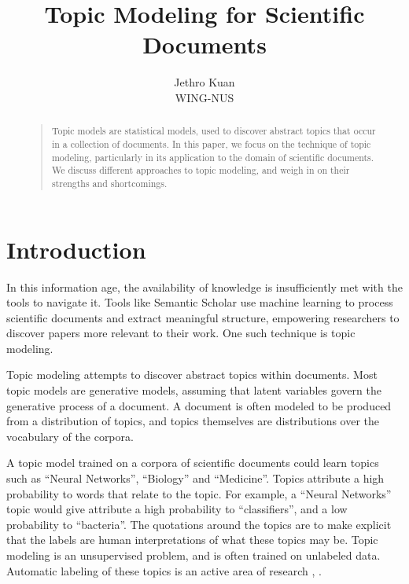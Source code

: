 \documentclass[letterpaper]{article}
\begin{document}
\nocopyright


\title{Topic Modeling for Scientific Documents}
\author{Jethro Kuan \\
  WING-NUS\\
}
\maketitle
\begin{abstract}
  \begin{quote}
    Topic models are statistical models, used to discover abstract
    topics that occur in a collection of documents. In this paper, we
    focus on the technique of topic modeling, particularly in its
    application to the domain of scientific documents. We discuss
    different approaches to topic modeling, and weigh in on their
    strengths and shortcomings.
  \end{quote}
\end{abstract}

\section{Introduction}
In this information age, the availability of knowledge is
insufficiently met with the tools to navigate it. Tools like Semantic
Scholar use machine learning to process scientific documents and
extract meaningful structure, empowering researchers to discover
papers more relevant to their work. One such technique is topic
modeling.

Topic modeling attempts to discover abstract topics within documents.
Most topic models are generative models, assuming that latent
variables govern the generative process of a document. A document is
often modeled to be produced from a distribution of topics, and topics
themselves are distributions over the vocabulary of the corpora.

A topic model trained on a corpora of scientific documents could learn
topics such as ``Neural Networks'', ``Biology'' and ``Medicine''.
Topics attribute a high probability to words that relate to the topic.
For example, a ``Neural Networks'' topic would give attribute a high
probability to ``classifiers'', and a low probability to ``bacteria''.
The quotations around the topics are to make explicit that the labels
are human interpretations of what these topics may be. Topic modeling
is an unsupervised problem, and is often trained on unlabeled data.
Automatic labeling of these topics is an active area of research
\cite{mei2007automatic}, \cite{lau2011automatic}.
\end{document}
